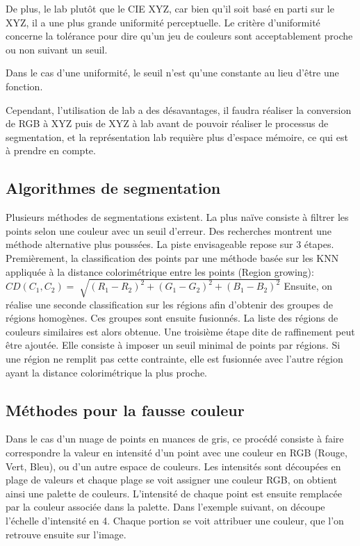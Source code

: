 \documentclass[12pt,titlepage,french]{article}
\begin{document}
De plus, le lab plutôt que le CIE XYZ, car bien qu'il soit basé en parti sur le XYZ, il a une plus grande uniformité perceptuelle. Le critère d'uniformité concerne la tolérance pour dire qu'un jeu de couleurs sont acceptablement proche ou non suivant un seuil.

Dans le cas d'une uniformité, le seuil n'est qu'une constante au lieu d'être une fonction.

Cependant, l'utilisation de lab a des désavantages, il faudra réaliser la conversion de RGB à XYZ puis de XYZ à lab avant de pouvoir réaliser le processus de segmentation, et la représentation lab requière plus d'espace mémoire, ce qui est à prendre en compte.

\subsection{Algorithmes de segmentation}
Plusieurs méthodes de segmentations existent. La plus naïve consiste à filtrer les points selon une couleur avec un seuil d'erreur.
Des recherches montrent une méthode alternative plus poussées.
La piste envisageable repose sur 3 étapes.
Premièrement, la classification des points par une méthode basée sur les KNN appliquée à la distance colorimétrique entre les points (Region growing):
$
CD(C_1,C_2)=\sqrt[]{(R_1-R_2)^2 + (G_1-G_2)^2 + (B_1-B_2)^2}
$
Ensuite, on réalise une seconde classification sur les régions afin d'obtenir des groupes de régions homogènes.
Ces groupes sont ensuite fusionnés. La liste des régions de couleurs similaires est alors obtenue.
Une troisième étape dite de raffinement peut être ajoutée. Elle consiste à imposer un seuil minimal de points par régions.
Si une région ne remplit pas cette contrainte, elle est fusionnée avec l'autre région ayant la distance colorimétrique la plus proche.

\subsection{Méthodes pour la fausse couleur}
Dans le cas d'un nuage de points en nuances de gris, ce procédé consiste à faire correspondre la valeur en intensité d'un point avec une couleur en RGB (Rouge, Vert, Bleu), ou d'un autre espace de couleurs.
Les intensités sont découpées en plage de valeurs et chaque plage se voit assigner une couleur RGB, on obtient ainsi une palette de couleurs. L'intensité de chaque point est ensuite remplacée par la couleur associée dans la palette.
Dans l'exemple suivant, on découpe l'échelle d'intensité en 4. Chaque portion se voit attribuer une couleur, que l'on retrouve ensuite sur l'image.
\end{document}
